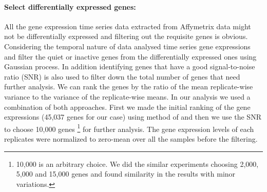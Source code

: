 \paragraph{Select differentially expressed genes:}
All the gene expression time series data extracted from Affymetrix data might not be differentially expressed and filtering out the requisite genes is obvious. Considering the temporal nature of data \cite{Kalaitzis:2011} analysed time series gene expressions and filter the quiet or inactive genes from the differentially expressed ones using Gaussian process.  In addition identifying genes that have a good signal-to-noise ratio (SNR) is also used to filter down the total number of genes that need further analysis. We can rank the genes by the ratio of the mean replicate-wise variance to the variance of the replicate-wise means. In our analysis we used a combination of both approaches.  First we made the initial ranking of the gene expressions (45,037 genes for our case) using method of \cite{Kalaitzis:2011} and then we use the SNR to choose 10,000 genes \footnote{10,000 is an arbitrary choice. We did the similar experiments choosing 2,000, 5,000 and 15,000 genes and found similarity in the results with minor variations.} for further analysis. The gene expression levels of each replicates were normalized to zero-mean over all the samples before the filtering.

